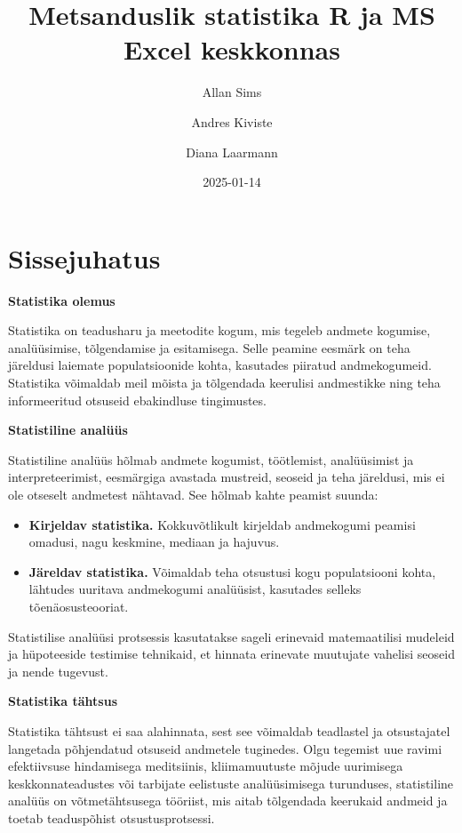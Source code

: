 \documentclass[
]{book}
\title{Metsanduslik statistika R ja MS Excel keskkonnas}
\author{Allan Sims \and Andres Kiviste \and Diana Laarmann}
\date{2025-01-14}
\providecommand{\tightlist}{%
  \setlength{\itemsep}{0pt}\setlength{\parskip}{0pt}}
\begin{document}
\maketitle

{
\setcounter{tocdepth}{1}
\tableofcontents
}
\chapter{Sissejuhatus}\label{sissejuhatus}

\textbf{Statistika olemus}

Statistika on teadusharu ja meetodite kogum, mis tegeleb andmete kogumise, analüüsimise, tõlgendamise ja esitamisega. Selle peamine eesmärk on teha järeldusi laiemate populatsioonide kohta, kasutades piiratud andmekogumeid. Statistika võimaldab meil mõista ja tõlgendada keerulisi andmestikke ning teha informeeritud otsuseid ebakindluse tingimustes.

\textbf{Statistiline analüüs}

Statistiline analüüs hõlmab andmete kogumist, töötlemist, analüüsimist ja interpreteerimist, eesmärgiga avastada mustreid, seoseid ja teha järeldusi, mis ei ole otseselt andmetest nähtavad. See hõlmab kahte peamist suunda:

\begin{itemize}
\tightlist
\item
  \textbf{Kirjeldav statistika.} Kokkuvõtlikult kirjeldab andmekogumi peamisi omadusi, nagu keskmine, mediaan ja hajuvus.
\item
  \textbf{Järeldav statistika.} Võimaldab teha otsustusi kogu populatsiooni kohta, lähtudes uuritava andmekogumi analüüsist, kasutades selleks tõenäosusteooriat.
\end{itemize}

Statistilise analüüsi protsessis kasutatakse sageli erinevaid matemaatilisi mudeleid ja hüpoteeside testimise tehnikaid, et hinnata erinevate muutujate vahelisi seoseid ja nende tugevust.

\textbf{Statistika tähtsus}

Statistika tähtsust ei saa alahinnata, sest see võimaldab teadlastel ja otsustajatel langetada põhjendatud otsuseid andmetele tuginedes. Olgu tegemist uue ravimi efektiivsuse hindamisega meditsiinis, kliimamuutuste mõjude uurimisega keskkonnateadustes või tarbijate eelistuste analüüsimisega turunduses, statistiline analüüs on võtmetähtsusega tööriist, mis aitab tõlgendada keerukaid andmeid ja toetab teaduspõhist otsustusprotsessi.
\end{document}
